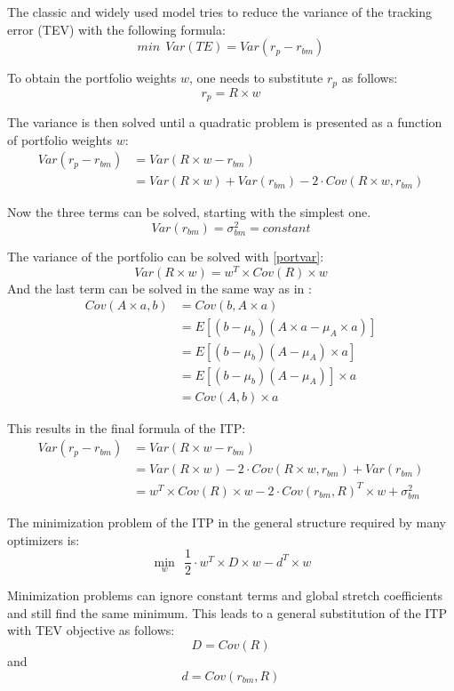 \documentclass[
  oneside]{book}
\begin{document}
The classic and widely used model tries to reduce the variance of the tracking error (TEV) with the following formula:
\[
 min \ \ Var(TE) = Var(r_{p}-r_{bm})
\]

To obtain the portfolio weights \(w\), one needs to substitute \(r_{p}\) as follows:
\[
  r_{p} = R \times w
\]

The variance is then solved until a quadratic problem is presented as a function of portfolio weights \(w\):
\begin{align*}
 Var(r_{p}-r_{bm}) &= Var(R \times w - r_{bm}) \\
 &= Var(R \times w) + Var(r_{bm}) - 2 \cdot Cov(R \times w,r_{bm}) 
\end{align*}

Now the three terms can be solved, starting with the simplest one.
\[
Var(r_{bm}) = \sigma_{bm}^2 = constant
\]

The variance of the portfolio can be solved with \ref{portvar}:
\[
Var(R \times w) = w^T \times Cov(R) \times w
\]
And the last term can be solved in the same way as in \citep{Eric2021}:
\begin{align*}
  Cov(A \times a, b) &= Cov(b, A \times a) \\
  &= E[(b-\mu_{b})(A \times a-\mu_{A} \times a)] \\
  &= E[(b-\mu_{b})(A-\mu_{A}) \times a] \\
  &= E[(b-\mu_{b})(A-\mu_{A})] \times a \\
  &= Cov(A,b) \times a
\end{align*}

This results in the final formula of the ITP:
\begin{align*}
  Var(r_{p}-r_{bm}) & = Var(R \times w - r_{bm}) \\
  & = Var(R \times w) - 2 \cdot Cov(R \times w,r_{bm}) + Var(r_{bm})  \\
  & = w^T \times Cov(R) \times w - 2 \cdot Cov(r_{bm}, R)^T \times w + \sigma_{bm}^2
  \label{eq:ITP}
\end{align*}

The minimization problem of the ITP in the general structure required by many optimizers is:
\[
  \min\limits_{w} \ \ \frac{1}{2} \cdot w^T \times D \times w -d^T \times w
\]

Minimization problems can ignore constant terms and global stretch coefficients and still find the same minimum. This leads to a general substitution of the ITP with TEV objective as follows:
\[
  D = Cov(R)
\]
and
\[
d = Cov(r_{bm}, R)
\]
\end{document}
